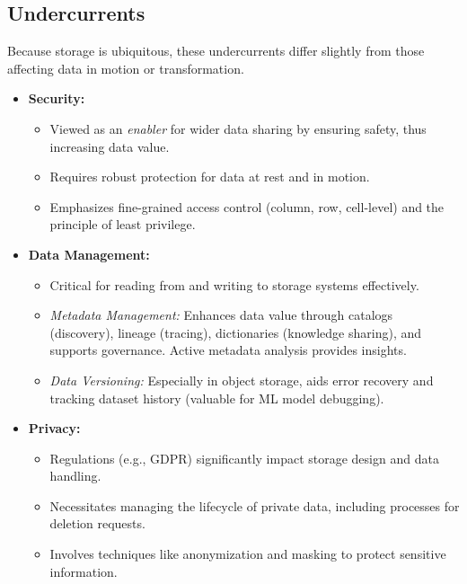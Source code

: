 \subsection{Undercurrents}
Because storage is ubiquitous, these undercurrents differ slightly
from those affecting data in motion or transformation.

\begin{itemize}
    \item \textbf{Security:}
    \begin{itemize}
        \item Viewed as an \textit{enabler} for wider data sharing
        by ensuring safety, thus increasing data value.
        \item Requires robust protection for data at rest and in
        motion.
        \item Emphasizes fine-grained access control (column, row,
        cell-level) and the principle of least privilege.
    \end{itemize}

    \item \textbf{Data Management:}
    \begin{itemize}
        \item Critical for reading from and writing to storage
        systems effectively.

        \item \textit{Metadata Management:} Enhances data value
        through catalogs (discovery), lineage (tracing),
        dictionaries (knowledge sharing), and supports governance.
        Active metadata analysis provides insights.

        \item \textit{Data Versioning:} Especially in object storage,
        aids error recovery and tracking dataset history
        (valuable for ML model debugging).
    \end{itemize}

    \item \textbf{Privacy:}
    \begin{itemize}
        \item Regulations (e.g., GDPR) significantly impact storage
        design and data handling.

        \item Necessitates managing the lifecycle of private data,
        including processes for deletion requests.

        \item Involves techniques like anonymization and masking to
        protect sensitive information.
    \end{itemize}


\end{itemize}
